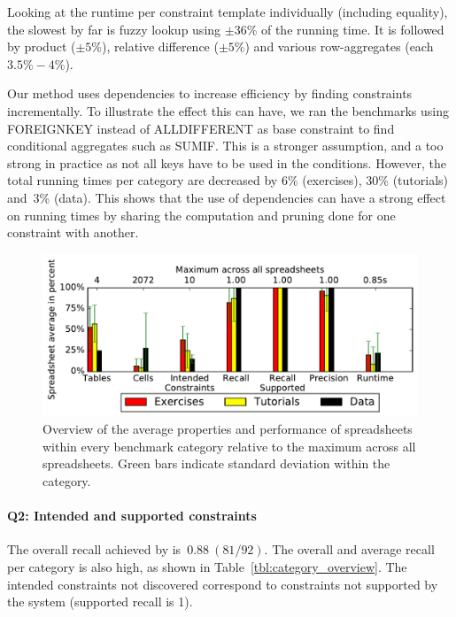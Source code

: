 
Looking at the runtime per constraint template individually (including equality), the slowest by far is fuzzy lookup using $\pm 36\%$ of the running time.
It is followed by product ($\pm 5\%$), relative difference ($\pm 5\%$) and various row-aggregates (each $3.5\% - 4\%$).

Our method uses dependencies to increase efficiency by finding constraints incrementally. To illustrate the effect this can have, we ran the benchmarks using FOREIGNKEY instead of ALLDIFFERENT as base constraint to find conditional aggregates such as SUMIF. This is a stronger assumption, and a too strong in practice as not all keys have to be used in the conditions. However, the total running times per category are decreased by 6\% (exercises), 30\% (tutorials) and~3\% (data). This shows that the use of dependencies can have a strong effect on running times by sharing the computation and pruning done for one constraint with another.

\begin{figure}[t]
  \centering
  \includegraphics[width=1\linewidth]{figures/comparison.pdf}
  \caption{Overview of the average properties and performance of spreadsheets within every benchmark category relative to the maximum across all spreadsheets.
  Green bars indicate standard deviation within the category.}
  \label{fig:comparison}
\end{figure}


\paragraph{Q2: Intended and supported constraints}
The overall recall achieved by \sname is~$0.88~(81/92)$. The overall and average recall per category is also high, as shown in Table~\ref{tbl:category_overview}.
The intended constraints not discovered correspond to constraints not supported by the system (supported recall is 1). 


